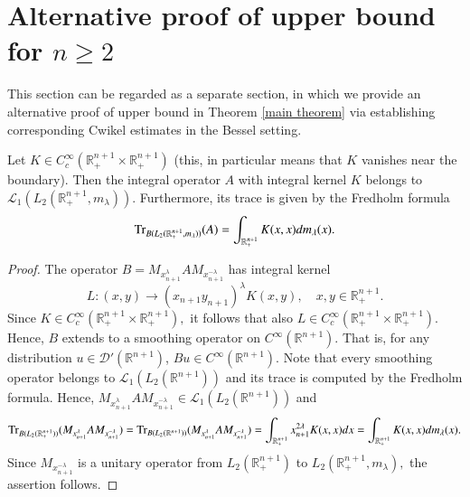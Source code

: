 \documentclass[12pt]{amsart}
\begin{document}
\section{Alternative proof of upper bound for $n\geq 2$}\label{alternativepf}
\setcounter{equation}{0}

This section can be regarded as a separate section, in which we provide an alternative proof of upper bound in Theorem \ref{main theorem} via establishing corresponding Cwikel estimates in the Bessel setting.

{\color{blue}
\begin{lemma}\label{smoothing fact} Let $K\in C^{\infty}_c(\mathbb{R}^{n+1}_+\times\mathbb{R}^{n+1}_+)$ (this, in particular means that $K$ vanishes near the boundary). Then the integral operator $A$ with integral kernel $K$ belongs to $\mathcal{L}_1(L_2(\mathbb{R}^{n+1}_+,m_{\lambda})).$ Furthermore, its trace is given by the Fredholm formula
$${\rm Tr}_{B(L_2(\mathbb{R}^{n+1}_+,m_{\lambda}))}(A)=\int_{\mathbb{R}^{n+1}_+}K(x,x)dm_{\lambda}(x).$$
\end{lemma}
\begin{proof} The operator $B=M_{x_{n+1}^{\lambda}}AM_{x_{n+1}^{-\lambda}}$ has integral kernel
$$L:(x,y)\to (x_{n+1}y_{n+1})^{\lambda}K(x,y),\quad x,y\in\mathbb{R}^{n+1}_+.$$
Since $K\in C^{\infty}_c(\mathbb{R}^{n+1}_+\times\mathbb{R}^{n+1}_+),$ it follows that also $L\in C^{\infty}_c(\mathbb{R}^{n+1}_+\times\mathbb{R}^{n+1}_+).$ Hence, $B$ extends to a smoothing operator on $C^{\infty}(\mathbb{R}^{n+1}).$ That is, for any distribution $u\in \mathcal{D}'(\mathbb{R}^{n+1})$, $Bu\in C^\infty(\mathbb{R}^{n+1})$. Note that every smoothing operator belongs to $\mathcal{L}_1(L_2(\mathbb{R}^{n+1}))$ and its trace is computed by the Fredholm formula. Hence, $M_{x_{n+1}^{\lambda}}AM_{x_{n+1}^{-\lambda}}\in\mathcal{L}_1(L_2(\mathbb{R}^{n+1}))$ and
$${\rm Tr}_{B(L_2(\mathbb{R}^{n+1}_+))}(M_{x_{n+1}^{\lambda}}AM_{x_{n+1}^{-\lambda}})={\rm Tr}_{B(L_2(\mathbb{R}^{n+1}))}(M_{x_{n+1}^{\lambda}}AM_{x_{n+1}^{-\lambda}})=\int_{\mathbb{R}^{n+1}_+}x_{n+1}^{2\lambda}K(x,x)dx=\int_{\mathbb{R}^{n+1}_+}K(x,x)dm_{\lambda}(x).$$
Since $M_{x_{n+1}^{-\lambda}}$ is a unitary operator from $L_2(\mathbb{R}^{n+1}_+)$ to $L_2(\mathbb{R}^{n+1}_+,m_{\lambda}),$ the assertion follows.
\end{proof}}
\end{document}
